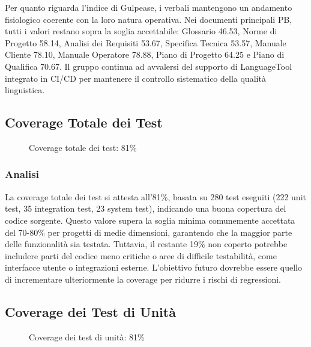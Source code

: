 \documentclass[a4paper,11pt,oneside]{scrartcl}
\begin{document}
Per quanto riguarda l'indice di Gulpease, i verbali mantengono un andamento fisiologico coerente con la loro natura operativa. Nei documenti principali PB, tutti i valori restano sopra la soglia accettabile: Glossario 46.53, Norme di Progetto 58.14, Analisi dei Requisiti 53.67, Specifica Tecnica 53.57, Manuale Cliente 78.10, Manuale Operatore 78.88, Piano di Progetto 64.25 e Piano di Qualifica 70.67. Il gruppo continua ad avvalersi del supporto di LanguageTool integrato in CI/CD per mantenere il controllo sistematico della qualità linguistica.

\subsection{Coverage Totale dei Test}

\begin{figure}[H]
    \centering
    \caption{Coverage totale dei test: 81\%}
    \label{fig:coverage_totale}
\end{figure}

\subsubsection*{Analisi}

La coverage totale dei test si attesta all'81\%, basata su 280 test eseguiti (222 unit test, 35 integration test, 23 system test), indicando una buona copertura del codice sorgente. Questo valore supera la soglia minima comunemente accettata del 70-80\% per progetti di medie dimensioni, garantendo che la maggior parte delle funzionalità sia testata. Tuttavia, il restante 19\% non coperto potrebbe includere parti del codice meno critiche o aree di difficile testabilità, come interfacce utente o integrazioni esterne. L'obiettivo futuro dovrebbe essere quello di incrementare ulteriormente la coverage per ridurre i rischi di regressioni.

\subsection{Coverage dei Test di Unità}

\begin{figure}[H]
    \centering
    \caption{Coverage dei test di unità: 81\%}
    \label{fig:coverage_unita}
\end{figure}
\end{document}
